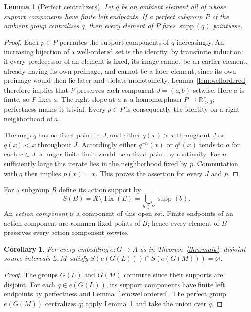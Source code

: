 \documentclass[10pt]{article}
\newtheorem{lemma}[theorem]{Lemma}
\newtheorem{corollary}[theorem]{Corollary}
\theoremstyle{definition}
\newcommand{\R}{\mathbb R}
\newcommand{\supp}{\operatorname{supp}}
\newcommand{\Fix}{\operatorname{Fix}}
\begin{document}
\begin{lemma}[Perfect centralizers]\label{lem:centralizer}
Let $q$ be an ambient element all of whose support components have
finite left endpoints. If a perfect subgroup $P$ of the ambient group
centralizes $q$, then every element of $P$ fixes $\supp(q)$ pointwise.
\end{lemma}

\begin{proof}
Each $p\in P$ permutes the support components of $q$ increasingly.
An increasing bijection of a well-ordered set is the identity, by
transfinite induction: if every predecessor of an element is fixed,
its image cannot be an earlier element, already having its own
preimage, and cannot be a later element, since its own preimage would
then lie later and violate monotonicity.
Lemma~\ref{lem:wellordered} therefore implies that $P$ preserves
each component $J=(a,b)$ setwise. Here $a$ is finite, so $P$ fixes $a$.
The right slope at $a$ is a homomorphism $P\to\R_{>0}^{\times}$;
perfectness makes it trivial. Every $p\in P$ is consequently the
identity on a right neighborhood of $a$.

The map $q$ has no fixed point in $J$, and either $q(x)>x$ throughout
$J$ or $q(x)<x$ throughout $J$. Accordingly either $q^{-n}(x)$ or
$q^n(x)$ tends to $a$ for each $x\in J$: a larger finite limit would
be a fixed point by continuity. For $n$ sufficiently large this
iterate lies in the neighborhood fixed by $p$. Commutation with $q$
then implies $p(x)=x$. This proves the assertion for every $J$ and $p$.
\end{proof}

For a subgroup $B$ define its action support by
\[
 S(B)=X\setminus\Fix(B)=\bigcup_{b\in B}\supp(b).
\]
An \emph{action component} is a component of this open set. Finite
endpoints of an action component are common fixed points of $B$;
hence every element of $B$ preserves every action component setwise.

\begin{corollary}\label{cor:disjoint}
For every embedding $e:G\to A$ as in Theorem~\ref{thm:main}, disjoint
source intervals $L,M$ satisfy
$S(e(G(L)))\cap S(e(G(M)))=\varnothing$.
\end{corollary}

\begin{proof}
The groups $G(L)$ and $G(M)$ commute since their supports are disjoint.
For each $q\in e(G(L))$, its support components have finite left
endpoints by perfectness and Lemma~\ref{lem:wellordered}.
The perfect group $e(G(M))$ centralizes $q$; apply
Lemma~\ref{lem:centralizer} and take the union over $q$.
\end{proof}
\end{document}
